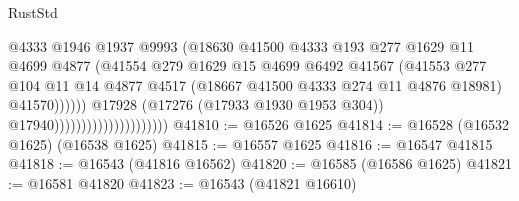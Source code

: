 \begin{lexlean}{RustStd}
\begin{coremodule}
                                                    @4333
                                                    @1946
                                                    @1937
                                                    @9993
                                                    (@18630
                                                      @41500
                                                      @4333
                                                      @193
                                                      @277
                                                      @1629
                                                      @11
                                                      @4699
                                                      @4877
                                                      (@41554
                                                        @279
                                                        @1629
                                                        @15
                                                        @4699
                                                        @6492
                                                        @41567
                                                        (@41553
                                                          @277
                                                          @104
                                                          @11
                                                          @14
                                                          @4877
                                                          @4517
                                                          (@18667
                                                            @41500
                                                            @4333
                                                            @274
                                                            @11
                                                            @4876
                                                            @18981)
                                                          @41570))))))
                                              @17928
                                              (@17276 (@17933 @1930 @1953 @304))
                                              @17940)))))))))))))))))))))
@41810 := @16526 @1625
@41814 := @16528 (@16532 @1625) (@16538 @1625)
@41815 := @16557 @1625
@41816 := @16547 @41815
@41818 := @16543 (@41816 @16562)
@41820 := @16585 (@16586 @1625)
@41821 := @16581 @41820
@41823 := @16543 (@41821 @16610)

\end{coremodule}
\end{lexlean}
